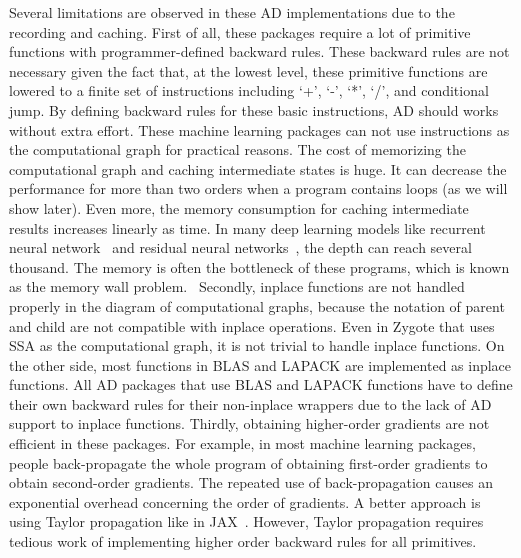 \documentclass[aps,twocolumn,longbibliography,english,superscriptaddress]{revtex4-1}
\newcommand{\<}{\langle}
\renewcommand{\>}{\rangle}
\theoremstyle{definition}\newtheorem{definition}{\textit{Definition}}
\begin{document}
    Several limitations are observed in these AD implementations due to the recording and caching. First of all, these packages require a lot of primitive functions with programmer-defined backward rules. These backward rules are not necessary given the fact that, at the lowest level, these primitive functions are lowered to a finite set of instructions including `+', `-', `*', `/', and conditional jump. By defining backward rules for these basic instructions, AD should works without extra effort. These machine learning packages can not use instructions as the computational graph for practical reasons. The cost of memorizing the computational graph and caching intermediate states is huge. It can decrease the performance for more than two orders when a program contains loops (as we will show later).
    Even more, the memory consumption for caching intermediate results increases linearly as time. In many deep learning models like recurrent neural network~\cite{Lipton2015} and residual neural networks~\cite{He2016}, the depth can reach several thousand. The memory is often the bottleneck of these programs, which is known as the memory wall problem.~\cite{memorywall}
    Secondly, inplace functions are not handled properly in the diagram of computational graphs, because the notation of parent and child are not compatible with inplace operations.
 Even in Zygote that uses SSA as the computational graph, it is not trivial to handle inplace functions.
    On the other side, most functions in BLAS and LAPACK are implemented as inplace functions. All AD packages that use BLAS and LAPACK functions have to define their own backward rules for their non-inplace wrappers due to the lack of AD support to inplace functions.
    Thirdly, obtaining higher-order gradients are not efficient in these packages. For example, in most machine learning packages, people back-propagate the whole program of obtaining first-order gradients to obtain second-order gradients. The repeated use of back-propagation causes an exponential overhead concerning the order of gradients. A better approach is using Taylor propagation like in JAX~\cite{Bettencourt2019}. However, Taylor propagation requires tedious work of implementing higher order backward rules for all primitives. %

\end{document}
